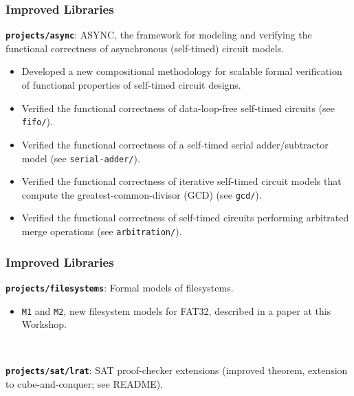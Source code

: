 \documentclass{beamer}
\newcommand{\code}[1]{\texttt{#1}}
\newcommand{\bookpath}[1]{\textbf{\code{#1}}}
\newcommand{\implibtitle}{\frametitle{Improved Libraries}}
\begin{document}

\begin{frame}

\implibtitle

\bookpath{projects/async}:
ASYNC, the framework for modeling and verifying the functional correctness
of asynchronous (self-timed) circuit models.
\begin{itemize}
\item
Developed a new compositional methodology for scalable formal
verification of functional properties of self-timed circuit designs.
\item
Verified the functional correctness of data-loop-free self-timed
circuits (see \code{fifo/}).
\item
Verified the functional correctness of a self-timed serial
adder/subtractor model (see \code{serial-adder/}).
\item
Verified the functional correctness of iterative self-timed circuit
models that compute the greatest-common-divisor (GCD) (see \code{gcd/}).
\item
Verified the functional correctness of self-timed circuits performing
arbitrated merge operations (see \code{arbitration/}).
\end{itemize}

\end{frame}


\begin{frame}

\implibtitle

\bookpath{projects/filesystems}:
Formal models of filesystems.
\begin{itemize}
\item
\texttt{M1} and \texttt{M2}, new filesystem models for FAT32,
described in a paper at this Workshop.
\end{itemize}

\

\bookpath{projects/sat/lrat}:
SAT proof-checker extensions (improved theorem, extension to
cube-and-conquer; see README).

\end{frame}

\end{document}
